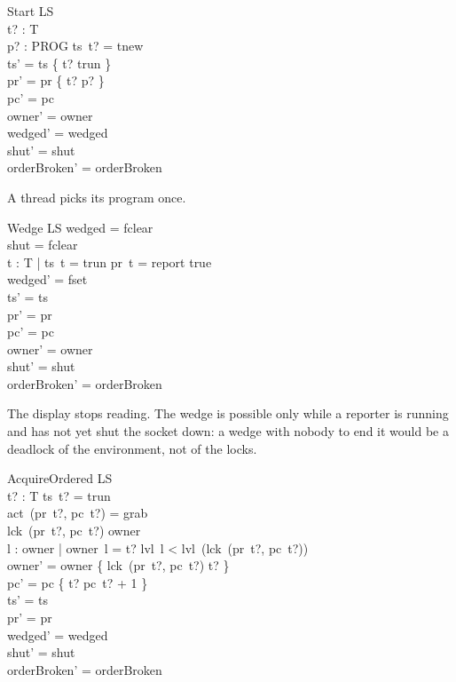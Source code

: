 \documentclass[a4paper,10pt,fleqn]{article}
\begin{document}
\begin{schema}{Start}
  \Delta LS \\
  t? : T \\
  p? : PROG
\where
  ts~t? = tnew \\
  ts' = ts \oplus \{ t? \mapsto trun \} \\
  pr' = pr \oplus \{ t? \mapsto p? \} \\
  pc' = pc \\
  owner' = owner \\
  wedged' = wedged \\
  shut' = shut \\
  orderBroken' = orderBroken
\end{schema}

A thread picks its program once.

\begin{schema}{Wedge}
  \Delta LS
\where
  wedged = fclear \\
  shut = fclear \\
  \exists t : T | ts~t = trun \land pr~t = report \spot true \\
  wedged' = fset \\
  ts' = ts \\
  pr' = pr \\
  pc' = pc \\
  owner' = owner \\
  shut' = shut \\
  orderBroken' = orderBroken
\end{schema}

The display stops reading.  The wedge is possible only while a reporter is
running and has not yet shut the socket down: a wedge with nobody to end it
would be a deadlock of the environment, not of the locks.

\begin{schema}{AcquireOrdered}
  \Delta LS \\
  t? : T
\where
  ts~t? = trun \\
  act~(pr~t?, pc~t?) = grab \\
  lck~(pr~t?, pc~t?) \notin \dom owner \\
  \forall l : \dom owner | owner~l = t? \spot
    lvl~l < lvl~(lck~(pr~t?, pc~t?)) \\
  owner' = owner \cup \{ lck~(pr~t?, pc~t?) \mapsto t? \} \\
  pc' = pc \oplus \{ t? \mapsto pc~t? + 1 \} \\
  ts' = ts \\
  pr' = pr \\
  wedged' = wedged \\
  shut' = shut \\
  orderBroken' = orderBroken
\end{schema}
\end{document}

